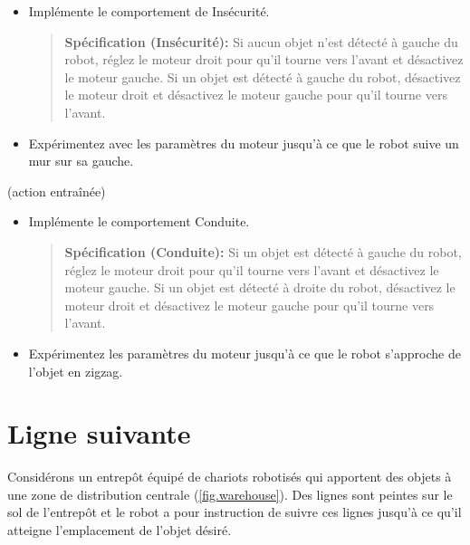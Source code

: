 {\begin{framed}
\begin{itemize}
\item Implémente le comportement de Insécurité.
\begin{quote}
\normalsize\noindent\textbf{Spécification (Insécurité):} Si aucun objet n'est détecté à gauche du robot, réglez le moteur droit pour qu'il tourne vers l'avant et désactivez le moteur gauche. Si un objet est détecté à gauche du robot, désactivez le moteur droit et désactivez le moteur gauche pour qu'il tourne vers l'avant.
\end{quote}
\item Expérimentez avec les paramètres du moteur jusqu'à ce que le robot suive un mur sur sa gauche.
\end{itemize}
\end{framed}

\begin{framed}
 (action entraînée)
\begin{itemize}
\item Implémente le comportement Conduite.
\begin{quote}
\normalsize\noindent\textbf{Spécification (Conduite):} Si un objet est détecté à gauche du robot, réglez le moteur droit pour qu'il tourne vers l'avant et désactivez le moteur gauche. Si un objet est détecté à droite du robot, désactivez le moteur droit et désactivez le moteur gauche pour qu'il tourne vers l'avant.
\end{quote}
\item Expérimentez les paramètres du moteur jusqu'à ce que le robot s'approche de l'objet en zigzag.
\end{itemize}
\end{framed}


\section{Ligne suivante}\label{s.line}

Considérons un entrepôt équipé de chariots robotisés qui apportent des objets à une zone de distribution centrale (\ref{fig.warehouse}). Des lignes sont peintes sur le sol de l'entrepôt et le robot a pour instruction de suivre ces lignes jusqu'à ce qu'il atteigne l'emplacement de l'objet désiré.

}
